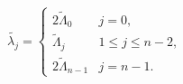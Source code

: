 \begin{equation}
 \tilde{\lambda_j} =
    \begin{cases}
       2\tilde{\Lambda}_0     & j=0 , \\
        \tilde{\Lambda}_j     & 1 \leq j \leq n-2 , \\
       2\tilde{\Lambda}_{n-1} & j=n-1 .
    \end{cases}
\label{eq:lambdatilde}
\end{equation}

